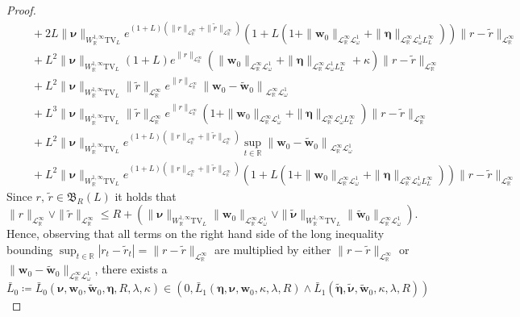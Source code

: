 \documentclass[11pt,oneside,english,reqno,dvipsnames,table]{amsart}
\numberwithin{equation}{section}
\theoremstyle{plain}
\theoremstyle{definition}
\theoremstyle{remark}
\theoremstyle{plain}
\theoremstyle{plain}
\theoremstyle{plain}
\theoremstyle{plain}
\theoremstyle{plain}
\theoremstyle{plain}
\theoremstyle{plain}
\newcommand{\TV}{\text{TV}}
\newcommand{\bw}{\mathbf{w}}
\newcommand{\mbR}{\mathbb{R}}
\newcommand{\mfB}{\mathfrak{B}}
\newcommand{\msL}{\mathscr{L}}
\newcommand{\bmeta}{\boldsymbol{\eta}}
\newcommand{\bnu}{\boldsymbol{\nu}}
\numberwithin{thm}{section}
\begin{document}
\begin{proof}
\begin{align*}
    	&\quad +  2L \|\bnu\|_{W^{1,\infty}_{\mbR}\TV_L}e^{(1+L)\left(\|r\|_{\msL^\infty_\mbR}+\|\tilde{r}\|_{\msL^\infty_\mbR}\right) }\left(1+ L\left(1+\|\bw_{0}\|_{\msL^\infty_{\mbR}\msL^1_\omega}+ \|\bmeta\|_{\msL^\infty_{\mbR} \msL^1_\omega L^\infty_{L}}\right) \right)\|r-\tilde{r}\|_{\msL^\infty_\mbR} \\
    	& \quad +  L^2 \|\bnu\|_{W^{1,\infty}_{\mbR}\TV_L}(1+L)e^{\|r\|_{\msL^\infty_\mbR}} \left(\|\bw_0\|_{\msL^\infty_\mbR \msL^1_\omega} +  \|\bmeta\|_{\msL^\infty_{\mbR} \msL^1_\omega L^\infty_{L}}+ \kappa \right)\|r-\tilde{r}\|_{\msL^\infty_\mbR}\\
    	&\quad +L^2\|\bnu\|_{W^{1,\infty}_{\mbR}\TV_L}\|\tilde{r}\|_{\msL^\infty_\mbR}  e^{\|r\|_{\msL^\infty_\mbR}} \left\|\bw_{0}-\tilde{\bw}_{0}\right\|_{\msL^\infty_\mbR \msL^1_\omega}\\
    	&\quad + L^3\|\bnu\|_{W^{1,\infty}_{\mbR}\TV_L}\|\tilde{r}\|_{\msL^\infty_\mbR}e^{\|r\|_{\msL^\infty_\mbR}}\left(1+\|\bw_0\|_{\msL^\infty_\mbR \msL^1_\omega} +  \|\bmeta\|_{\msL^\infty_{\mbR} \msL^1_\omega L^\infty_{L}}\right) \|r-\tilde{r}\|_{\msL^\infty_\mbR}\\
    	&\quad +L^2 \|\bnu\|_{W^{1,\infty}_{\mbR}\TV_L} e^{(1+L)\left(\|r\|_{\msL^\infty_\mbR}+\|\tilde{r}\|_{\msL^\infty_\mbR}\right) } \sup_{t\in \mbR}\left\|\bw_{0}-\tilde{\bw}_{0}\right\|_{\msL^\infty_\mbR \msL^1_\omega}\\
    	&\quad +  L^2 \|\bnu\|_{W^{1,\infty}_{\mbR}\TV_L}e^{(1+L)\left(\|r\|_{\msL^\infty_\mbR}+\|\tilde{r}\|_{\msL^\infty_\mbR}\right) }\left(1+ L\left(1+\|\bw_0\|_{\msL^\infty_\mbR \msL^1_\omega} +  \|\bmeta\|_{\msL^\infty_{\mbR} \msL^1_\omega L^\infty_{L}}\right)\right)\|r-\tilde{r}\|_{\msL^\infty_\mbR} 
    \end{align*}
    Since $r,\,\tilde{r} \in \mfB_R(L)$ it holds that
    \begin{equation*}
    	\|r\|_{\msL^\infty_{\mbR}} \vee \|\tilde{r}\|_{\msL^\infty_{\mbR}} \leq R + \left(\|\bnu\|_{W^{1,\infty}_{\mbR} \text{TV}_L} \|\bw_0\|_{\msL^\infty_{\mbR}\msL^1_{\omega}} \vee \|\tilde{\bnu}\|_{W^{1,\infty}_{\mbR} \text{TV}_L} \|\tilde{\bw}_0\|_{\msL^\infty_{\mbR}\msL^1_{\omega}} \right).
    \end{equation*}
    Hence, observing that all terms on the right hand side of the long inequality bounding $\sup_{t\in \mbR} |r_t-\tilde{r}_t| = \|r-\tilde{r}\|_{\msL^\infty_{\mbR}}$ are multiplied by either $\|r-\tilde{r}\|_{\msL^\infty_{\mbR}}$ or $\|\bw_0-\tilde{\bw}_0\|_{\msL^\infty_\mbR \msL^1_\omega}$, there exists a 
    \begin{equation*}
    	\bar{L}_0 \coloneqq \bar{L}_0(\bnu, \bw_0,\tilde{\bw}_0,\bmeta, R,\lambda,\kappa) \in \left(0,\bar{L}_1(\bmeta,\bnu,\bw_0,\kappa,\lambda,R)\wedge \bar{L}_1(\tilde{\bmeta}, \tilde{\bnu}, \tilde{\bw}_0,\kappa,\lambda,R) \right)
    \end{equation*}
    

\end{proof}
\end{document}
